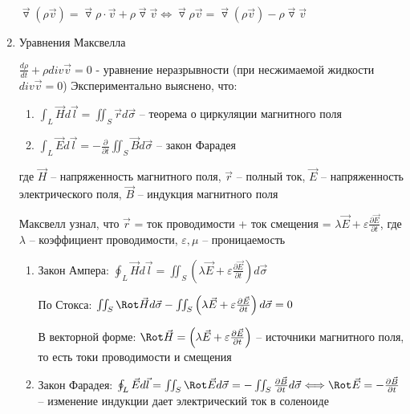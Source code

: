 \documentclass[12pt]{article}
\begin{document}
\begin{enumerate}[label*=\arabic** ]

    $\overrightarrow{\triangledown} (\rho \overrightarrow{v}) = \overrightarrow{\triangledown} \rho \cdot \overrightarrow{v} + \rho \overrightarrow{\triangledown} \overrightarrow{v} \Longleftrightarrow \overrightarrow{\triangledown} \rho \overrightarrow{v} = \overrightarrow{\triangledown} (\rho \overrightarrow{v}) - \rho \overrightarrow{\triangledown} \overrightarrow{v}$
        \item Уравнения Максвелла

    $\frac{d\rho}{dt} + \rho div \overrightarrow{v} = 0$ - уравнение неразрывности (при несжимаемой жидкости $div \overrightarrow{v} = 0$)
        Экспериментально выяснено, что: 
        
        \begin{enumerate}
            \item $\int_L \vec{H} d\vec{l} = \iint_S \vec{r}d\vec{\sigma}$ -- теорема о циркуляции магнитного поля

            \item $\int_L \vec{E} d\vec{l} = -\frac{\partial}{\partial t} \iint_S \vec{B}d\vec{\sigma}$ -- закон Фарадея
        \end{enumerate}

        где $\vec{H}$ -- напряженность магнитного поля, $\vec{r}$ -- полный ток, $\vec{E}$ -- напряженность электрического поля, $\vec{B}$ -- индукция магнитного поля

        Максвелл узнал, что $\vec{r}$ = ток проводимости + ток смещения = $\lambda \vec{E} + \varepsilon \frac{\partial \vec{E}}{\partial t}$, где $\lambda$ -- коэффициент проводимости, $\varepsilon, \mu$ -- проницаемость

        \begin{enumerate}
            \item Закон Ампера: $\oint_L \vec{H} d\vec{l} = \iint_S \left(\lambda \vec{E} + \varepsilon \frac{\partial \vec{E}}{\partial t}\right) d\vec{\sigma}$

            По \Ths Стокса: $\iint_S \Rot \vec{H} d\vec{\sigma} - \iint_S \left(\lambda \vec{E} + \varepsilon \frac{\partial \vec{E}}{\partial t}\right) d\vec{\sigma} = 0$

            В векторной форме: $\Rot \vec{H} = \left(\lambda \vec{E} + \varepsilon \frac{\partial \vec{E}}{\partial t}\right)$ -- источники магнитного поля, то есть токи проводимости и смещения

            \item Закон Фарадея: $\oint_L \vec{E}d\vec{l} = \iint_S \Rot \vec{E}d\vec{\sigma} = -\iint_S \frac{\partial \vec{B}}{\partial t}d\vec{\sigma} \Longleftrightarrow
            \Rot \vec{E} = -\frac{\partial \vec{B}}{\partial t}$ -- изменение индукции дает электрический ток в соленоиде


\end{enumerate}
\end{enumerate}
\end{document}
